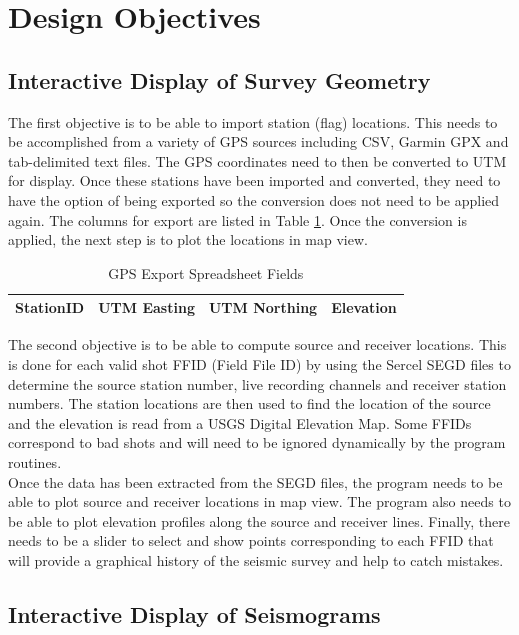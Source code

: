 \documentclass[12pt]{article}
\begin{document}
\section{Design Objectives}
\subsection{Interactive Display of Survey Geometry}

The first objective is to be able to import station (flag) locations. This needs to be accomplished from a variety of GPS sources including CSV, Garmin GPX and tab-delimited text files. The GPS coordinates need to then be converted to UTM for display. Once these stations have been imported and converted, they need to have the option of being exported so the conversion does not need to be applied again. The columns for export are listed in Table \ref{TAB:GPS}. Once the conversion is applied, the next step is to plot the locations in map view.

\begin{table}[H]
\caption{GPS Export Spreadsheet Fields}
\centering
\begin{tabular}{ c | c | c | c}
  \hline                  
  StationID & UTM Easting & UTM Northing & Elevation \\
  \hline
\end{tabular}
\label{TAB:GPS}
\end{table}

The second objective is to be able to compute source and receiver locations. This is done for each valid shot FFID (Field File ID) by using the Sercel SEGD files to determine the source station number, live recording channels and receiver station numbers. The station locations are then used to find the location of the source and the elevation is read from a USGS Digital Elevation Map. Some FFIDs correspond to bad shots and will need to be ignored dynamically by the program routines. \\

Once the data has been extracted from the SEGD files, the program needs to be able to plot source and receiver locations in map view. The program also needs to be able to plot elevation profiles along the source and receiver lines. Finally, there needs to be a slider to select and show points corresponding to each FFID that will provide a graphical history of the seismic survey and help to catch mistakes. 

\subsection{Interactive Display of Seismograms}
\end{document}
